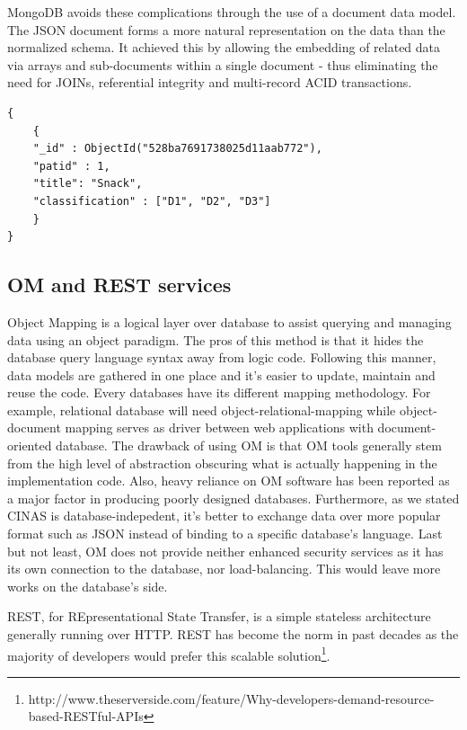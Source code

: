 \documentclass{sig-alternate}
\begin{document}
{MongoDB avoids these complications through the use of a document data model. The JSON document forms a more natural representation on the data than the normalized schema. It achieved this by allowing the embedding of related data via arrays and sub-documents within a single document - thus eliminating the need for JOINs, referential integrity and multi-record ACID transactions.

\begin{lstlisting}[caption=Json Example]
{
	{
	"_id" : ObjectId("528ba7691738025d11aab772"),
	"patid" : 1,
	"title": "Snack",
	"classification" : ["D1", "D2", "D3"]
	}
}
\end{lstlisting}

\subsection{OM and REST services}

Object Mapping is a logical layer over database to assist querying and managing data using an object paradigm. The pros of this method is that it hides the database query language syntax away from logic code. Following this manner, data models are gathered in one place and it's easier to update, maintain and reuse the code. Every databases have its different mapping methodology. For example, relational database will need object-relational-mapping while object-document mapping serves as driver between web applications with document-oriented database. The drawback of using OM is that OM tools generally stem from the high level of abstraction obscuring what is actually happening in the implementation code. Also, heavy reliance on OM software has been reported as a major factor in producing poorly designed databases. Furthermore, as we stated CINAS is database-indepedent, it's better to exchange data over more popular format such as JSON instead of binding to a specific database's language. Last but not least, OM does not provide neither enhanced security services as it has its own connection to the database, nor load-balancing. This would leave more works on the database's side.

REST, for REpresentational State Transfer, is a simple stateless architecture generally running over HTTP. REST has become the norm in past decades as the majority of developers would prefer this scalable solution\footnote{http://www.theserverside.com/feature/Why-developers-demand-resource-based-RESTful-APIs}.

}
\end{document}
